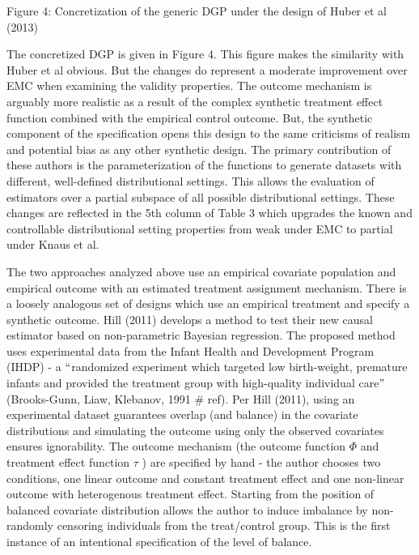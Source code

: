 \documentclass[../main.tex]{subfiles}
\begin{document}


\vspace{\baselineskip}
Figure 4: Concretization of the generic DGP under the design of Huber et al (2013)\par


\vspace{\baselineskip}
The concretized DGP is given in Figure 4. This figure makes the similarity with Huber et al obvious. But the changes do represent a moderate improvement over EMC when examining the validity properties. The outcome mechanism is arguably more realistic as a result of the complex synthetic treatment effect function combined with the empirical control outcome. But, the synthetic component of the specification opens this design to the same criticisms of realism and potential bias as any other synthetic design. The primary contribution of these authors is the parameterization of the functions to generate datasets with different, well-defined distributional settings. This allows the evaluation of estimators over a partial subspace of all possible distributional settings. These changes are reflected in the 5th column of Table 3 which upgrades the known and controllable distributional setting properties from weak under EMC to partial under Knaus et al.\par


\vspace{\baselineskip}
The two approaches analyzed above use an empirical covariate population and empirical outcome with an estimated treatment assignment mechanism. There is a loosely analogous set of designs which use an empirical treatment and specify a synthetic outcome. Hill (2011) develops a method to test their new causal estimator based on non-parametric Bayesian regression. The proposed method uses experimental data from the Infant Health and Development Program (IHDP) - a $``$randomized experiment which targeted low birth-weight, premature infants and provided the treatment group with high-quality individual care$"$  (Brooks-Gunn, Liaw, Klebanov, 1991 $\#$ ref). Per Hill (2011), using an experimental dataset guarantees overlap (and balance) in the covariate distributions and simulating the outcome using only the observed covariates ensures ignorability. The outcome mechanism (the outcome function  \(  \Phi  \) and treatment effect function  \(  \tau \) ) are specified by hand - the author chooses two conditions, one linear outcome and constant treatment effect and one non-linear outcome with heterogenous treatment effect. Starting from the position of balanced covariate distribution allows the author to induce imbalance by non-randomly censoring individuals from the treat/control group. This is the first instance of an intentional specification of the level of balance.\par
\end{document}
